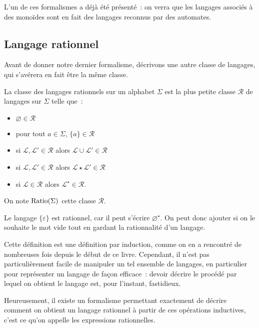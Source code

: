L'un de ces formalismes a déjà été présenté~: on verra que les langages associés
à des monoïdes sont en fait des langages reconnus par des automates.

\subsection{Langage rationnel}

Avant de donner notre dernier formalisme, décrivons une autre classe de
langages, qui s'avérera en fait être la même classe.

\begin{definition}
  La classe des langages rationnels sur un alphabet $\Sigma$ est la plus petite
  classe $\mathcal R$ de langages sur $\Sigma$ telle que~:
  \begin{itemize}
  \item $\varnothing \in \mathcal R$
  \item pour tout $a \in \Sigma$, $\{a\}\in \mathcal R$
  \item si $\mathcal L,\mathcal L' \in \mathcal R$ alors
    $\mathcal L\cup \mathcal L' \in \mathcal R$
  \item si $\mathcal L,\mathcal L' \in \mathcal R$ alors
    $\mathcal L\star \mathcal L' \in \mathcal R$
  \item si $\mathcal L \in \mathcal R$ alors $\mathcal L^\star \in \mathcal R$.
  \end{itemize}

  On note $\operatorname{Ratio}(\Sigma)$ cette classe $\mathcal R$.
\end{definition}

\begin{remark}
  Le langage $\{\varepsilon\}$ est rationnel, car il peut s'écrire
  $\varnothing^\star$. On peut donc ajouter si on le souhaite le mot vide tout
  en gardant la rationnalité d'un langage.
\end{remark}

Cette définition est une définition par induction, comme on en a rencontré
de nombreuses fois depuis le début de ce livre. Cependant, il n'est pas
particulièrement facile de manipuler un tel ensemble de langages, en particulier
pour représenter un langage de façon efficace~: devoir décrire le procédé par
lequel on obtient le langage est, pour l'instant, fastidieux.

Heureusement, il existe un formalisme permettant exactement de décrire comment
on obtient un langage rationnel à partir de ces opérations inductives, c'est ce
qu'on appelle les expressions rationnelles.

